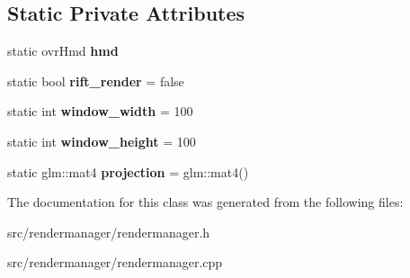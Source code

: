 \subsection*{Static Private Attributes}
\begin{DoxyCompactItemize}
\item 
\hypertarget{class_render_manager_a1c3cd0b8c87ad29f858df78de89191b0}{}static ovr\+Hmd {\bfseries hmd}\label{class_render_manager_a1c3cd0b8c87ad29f858df78de89191b0}

\item 
\hypertarget{class_render_manager_af6a19f9a588fa95d45b1eaf5942334c5}{}static bool {\bfseries rift\+\_\+render} = false\label{class_render_manager_af6a19f9a588fa95d45b1eaf5942334c5}

\item 
\hypertarget{class_render_manager_ac995fed430de5d9bad660bf170640468}{}static int {\bfseries window\+\_\+width} = 100\label{class_render_manager_ac995fed430de5d9bad660bf170640468}

\item 
\hypertarget{class_render_manager_a47d9c46fa986c2a0c2d003dd318cb751}{}static int {\bfseries window\+\_\+height} = 100\label{class_render_manager_a47d9c46fa986c2a0c2d003dd318cb751}

\item 
\hypertarget{class_render_manager_adbb9173579af6ce16bf2d7a5d3ae9b74}{}static glm\+::mat4 {\bfseries projection} = glm\+::mat4()\label{class_render_manager_adbb9173579af6ce16bf2d7a5d3ae9b74}

\end{DoxyCompactItemize}


The documentation for this class was generated from the following files\+:\begin{DoxyCompactItemize}
\item 
src/rendermanager/rendermanager.\+h\item 
src/rendermanager/rendermanager.\+cpp\end{DoxyCompactItemize}
